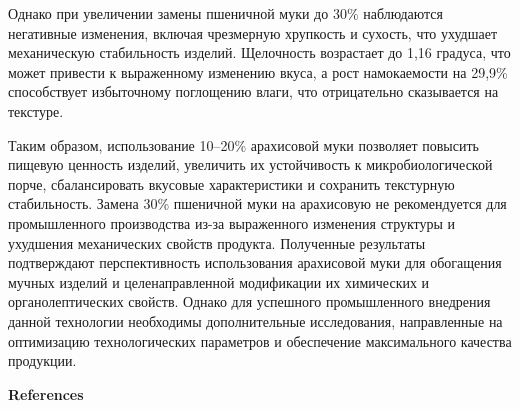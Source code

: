 \begin{multicols}{2}
Однако при увеличении замены пшеничной муки до 30\% наблюдаются
негативные изменения, включая чрезмерную хрупкость и сухость, что
ухудшает механическую стабильность изделий. Щелочность возрастает до
1,16 градуса, что может привести к выраженному изменению вкуса, а рост
намокаемости на 29,9\% способствует избыточному поглощению влаги, что
отрицательно сказывается на текстуре.

Таким образом, использование 10--20\% арахисовой муки позволяет повысить
пищевую ценность изделий, увеличить их устойчивость к микробиологической
порче, сбалансировать вкусовые характеристики и сохранить текстурную
стабильность. Замена 30\% пшеничной муки на арахисовую не рекомендуется
для промышленного производства из-за выраженного изменения структуры и
ухудшения механических свойств продукта. Полученные результаты
подтверждают перспективность использования арахисовой муки для
обогащения мучных изделий и целенаправленной модификации их химических и
органолептических свойств. Однако для успешного промышленного внедрения
данной технологии необходимы дополнительные исследования, направленные
на оптимизацию технологических параметров и обеспечение максимального
качества продукции.
\end{multicols}

\begin{center}
{\bfseries References}
\end{center}

